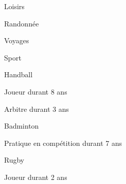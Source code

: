 

\begin{cventries}

  \cventry
    {} %
    {Loisirs} %
    {} %
    {} %
    {
      \begin{cvitems} %
        \item {Randonnée}
        \item {Voyages}
      \end{cvitems}
    }

  \cventry
    {} %
    {Sport} %
    {} %
    {} %
    {
      \begin{cvsubentries}
        \cvsubentry
          {}
          {Handball}
          {}
          {
            \begin{cvitems} %
              \item {Joueur durant 8 ans}
              \item {Arbitre durant 3 ans}
            \end{cvitems}
          }
        \cvsubentry
          {}
          {Badminton}
          {}
          {
            \begin{cvitems} %
              \item {Pratique en compétition durant 7 ans}
            \end{cvitems}
          }
        \cvsubentry
          {}
          {Rugby}
          {}
          {
            \begin{cvitems} %
              \item {Joueur durant 2 ans}
            \end{cvitems}
          }
      \end{cvsubentries}
    }

\end{cventries}
